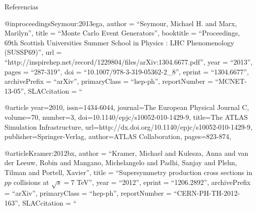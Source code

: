 Referencias

@inproceedings{Seymour:2013ega,
  author         = ``Seymour, Michael H. and Marx, Marilyn'',
  title          = ``{Monte Carlo Event Generators}'',
  booktitle      = ``{Proceedings, 69th Scottish Universities Summer School in
    Physics : LHC Phenomenology (SUSSP69)}'',
  url            = ``http://inspirehep.net/record/1229804/files/arXiv:1304.6677.pdf'',
  year           = ``2013'',
  pages          = ``287-319'',
  doi            = ``10.1007/978-3-319-05362-2_8'',
  eprint         = ``1304.6677'',
  archivePrefix  = ``arXiv'',
  primaryClass   = ``hep-ph'',
  reportNumber   = ``MCNET-13-05'',
  SLACcitation   = ``%
}

@article{
  year={2010},
  issn={1434-6044},
  journal={The European Physical Journal C},
  volume={70},
  number={3},
  doi={10.1140/epjc/s10052-010-1429-9},
  title={The ATLAS Simulation Infrastructure},
  url={http://dx.doi.org/10.1140/epjc/s10052-010-1429-9},
  publisher={Springer-Verlag},
  author={ATLAS Collaboration},
  pages={823-874},
  }

@article{Kramer:2012bx,
  author         = ``Kramer, Michael and Kulesza, Anna and van der Leeuw,
  Robin and Mangano, Michelangelo and Padhi, Sanjay and
  Plehn, Tilman and Portell, Xavier'',
  title          = ``{Supersymmetry production cross sections in $pp$
    collisions at $\sqrt{s}=7$ TeV}'',
  year           = ``2012'',
  eprint         = ``1206.2892'',
  archivePrefix  = ``arXiv'',
  primaryClass   = ``hep-ph'',
  reportNumber   = ``CERN-PH-TH-2012-163'',
  SLACcitation   = ``%
  }
